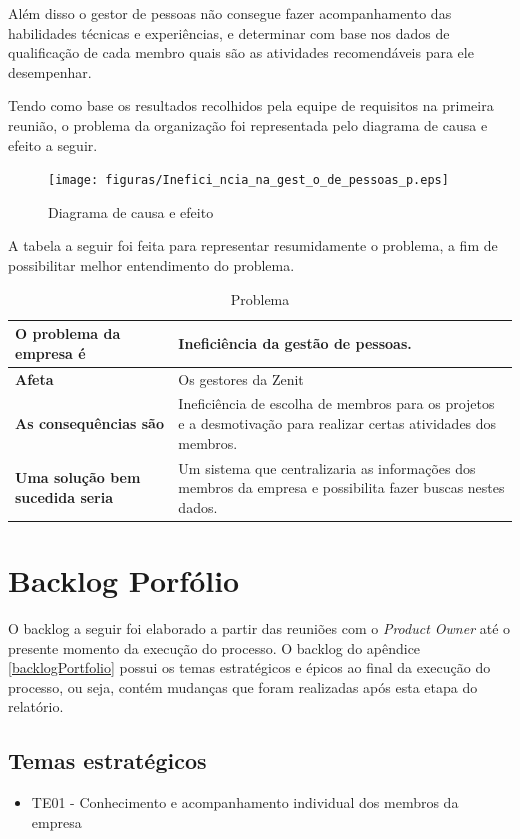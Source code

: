 Além disso o gestor de pessoas não consegue fazer acompanhamento das habilidades técnicas e experiências, e determinar com base nos dados de qualificação de cada membro quais são as atividades recomendáveis para ele desempenhar.

Tendo como base os resultados recolhidos pela equipe de requisitos na primeira reunião, o problema da organização foi representada pelo  diagrama de causa e efeito a seguir.

\begin{figure}[H]
    \centering
    \texttt{[image: figuras/Inefici\_ncia\_na\_gest\_o\_de\_pessoas\_p.eps]}
    \caption[Diagrama de causa e efeito]{Diagrama de causa e efeito\label{fishBone}}
\end{figure}

A tabela a seguir foi feita para representar resumidamente o problema, a fim de possibilitar melhor entendimento do problema.

\begin{table}[H]
    \centering
    \label{descricaoAtividades}
    \caption{Problema}
        \begin{tabular}{|l|p{10cm}|}
        \hline
        \textbf{O problema da empresa é} &Ineficiência da gestão de pessoas.\\
        \hline
        \textbf{Afeta} &Os gestores da Zenit\\
        \hline
        \textbf{As consequências são} &Ineficiência de escolha de membros para os projetos e a desmotivação para realizar certas atividades dos membros.\\
        \hline
        \textbf{Uma solução bem sucedida seria} &Um sistema que centralizaria as informações dos membros da empresa e possibilita fazer buscas nestes dados.\\
        \hline
    \end{tabular}
\end{table}

\section{Backlog Porfólio}
O backlog a seguir foi elaborado a partir das reuniões com o \textit{Product Owner} até o presente momento da execução do processo. O backlog do apêndice \ref{backlogPortfolio} possui os temas estratégicos e épicos ao final da execução do processo, ou seja, contém mudanças que foram realizadas após esta etapa do relatório.


\subsection{Temas estratégicos}
\label{temasEstrategicos}
\begin{itemize}
\item {TE01 - Conhecimento e acompanhamento individual dos membros da empresa}
\end{itemize}

